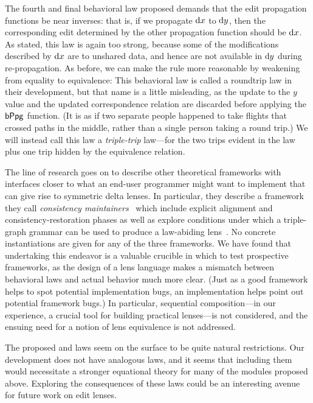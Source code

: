 The fourth and final behavioral law proposed demands that the edit
propagation functions be near inverses: that is, if we propagate $\textrm{d} x$ to
$\textrm{d} y$, then the corresponding edit determined by the other propagation
function should be $\textrm{d} x$. As stated, this law is again too strong, because
some of the modifications described by $\textrm{d} x$ are to unshared data, and hence
are not available in $\textrm{d} y$ during re-propagation. As before, we can make the
rule more reasonable by weakening from equality to equivalence:
This behavioral law is called a roundtrip law in their development, but that
name is a little misleading, as the update to the $y$ value and the updated
correspondence relation are discarded before applying the $\mathsf{bPpg}$
function. (It is as if two separate people happened to take flights that
crossed paths in the middle, rather than a single person taking a round
trip.) We will instead call this law a \emph{triple-trip} law---for the two
trips evident in the law plus one trip hidden by the equivalence relation.

The line of research goes on to describe other theoretical
frameworks with interfaces closer to what an end-user programmer might want
to implement that can give rise to symmetric delta lenses. In particular,
they describe a framework they call \emph{consistency
maintainers}~\cite{Diskin-Delta11} which include explicit alignment and
consistency-restoration phases as well as explore conditions under which a
triple-graph grammar can be used to produce a law-abiding
lens~\cite{hermann2011correctness}. No concrete instantiations are given for
any of the three frameworks. We have found that undertaking this endeavor is
a valuable crucible in which to test prospective frameworks, as the design
of a lens language makes a mismatch between behavioral laws and actual
behavior much more clear. (Just as a good framework helps to spot
potential implementation bugs, an implementation helps point out potential
framework bugs.) In particular, sequential composition---in our experience,
a crucial tool for building practical lenses---is not considered, and the
ensuing need for a notion of lens equivalence is not addressed.

The proposed  and  laws seem on the surface to
be quite natural restrictions. Our development does not have analogous laws,
and it seems that including them would necessitate a stronger equational
theory for many of the modules proposed above. Exploring the consequences of
these laws could be an interesting avenue for future work on edit lenses.

